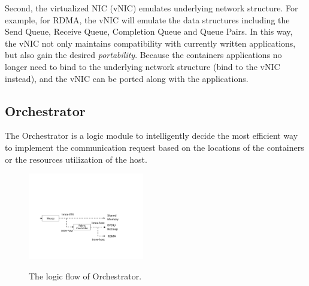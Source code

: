 Second, the virtualized NIC (vNIC) emulates underlying network structure. 
For example, for RDMA, the vNIC will emulate the data structures including the Send Queue, 
Receive Queue, Completion Queue and Queue Pairs.
In this way, the vNIC not only maintains compatibility with currently written applications, but also
gain the desired \emph{portability}. Because the containers applications no longer need to bind to
the underlying network structure (bind to the vNIC instead), and the vNIC can be ported along with
the applications.





\subsection{Orchestrator}
The Orchestrator is a logic module to intelligently decide the most
efficient way to implement the communication request based on the locations
of the containers or the resources utilization of the host.

     \begin{figure}[ht]
     \centering 
     \includegraphics[width=0.45\textwidth]{figures/system/system_locator.pdf}      
     \label{fig:system_locator}
     \caption{The logic flow of Orchestrator.} 
     \end{figure}

